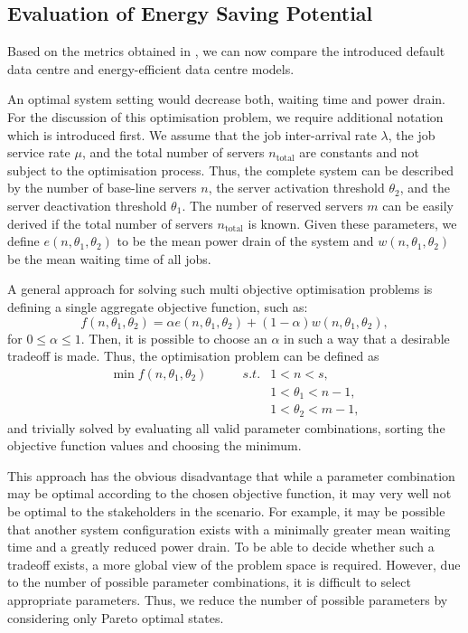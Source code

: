 \subsection{Evaluation of Energy Saving Potential}\label{sec:cloud:data_centers:performance_evaluation}
Based on the metrics obtained in , we can now compare the introduced default data centre and energy-efficient data centre models.

An optimal system setting would decrease both, waiting time and power drain.
For the discussion of this optimisation problem, we require additional notation which is introduced first.
We assume that the job inter-arrival rate \(\lambda\), the job service rate \(\mu\), and the total number of servers \(n_\text{total}\) are constants and not subject to the optimisation process.
Thus, the complete system can be described by the number of base-line servers \(n\), the server activation threshold \(\theta_2\), and the server deactivation threshold \(\theta_1\).
The number of reserved servers \(m\) can be easily derived if the total number of servers \(n_\text{total}\) is known.
Given these parameters, we define \(e(n, \theta_1, \theta_2)\) to be the mean power drain of the system and \(w(n, \theta_1, \theta_2)\) be the mean waiting time of all jobs.

A general approach for solving such multi objective optimisation problems is defining a single aggregate objective function, such as:
\begin{equation}
f(n, \theta_1, \theta_2) = \alpha e(n, \theta_1, \theta_2)  + (1-\alpha) w(n, \theta_1, \theta_2),
\end{equation}
for \(0\leq\alpha\leq 1\).
Then, it is possible to choose an \(\alpha\) in such a way that a desirable tradeoff is made. Thus, the optimisation problem can be defined as
\begin{align}
\min f(n, \theta_1, \theta_2) \qquad&s.t.& 1 < n < s,\\ 
&&1 < \theta_1 < n - 1,\nonumber\\
&&1 < \theta_2 < m - 1\nonumber,
\end{align}
and trivially solved by evaluating all valid parameter combinations, sorting the objective function values and choosing the minimum.

This approach has the obvious disadvantage that while a parameter combination may be optimal according to the chosen objective function, it may very well not be optimal to the stakeholders in the scenario.
For example, it may be possible that another system configuration exists with a minimally greater mean waiting time and a greatly reduced power drain.
To be able to decide whether such a tradeoff exists, a more global view of the problem space is required.
However, due to the number of possible parameter combinations, it is difficult to select appropriate parameters.
Thus, we reduce the number of possible parameters by considering only Pareto optimal states.

